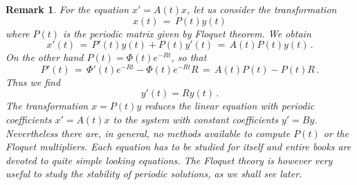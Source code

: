 \documentclass[12pt]{report}
\newtheorem{remark}[theorem]{Remark}
\begin{document}
\begin{remark}{\rm  For the equation $x'=A(t)x$, let us consider the 
transformation
\begin{equation}
x(t)\,=\, P(t) y(t)
\end{equation}
where $P(t)$ is the periodic matrix given by Floquet theorem.  We obtain
\begin{equation}
x'(t)\,=\, P'(t) y(t) + P(t) y'(t) \,=\, A(t) P(t) y(t) \,.
\end{equation}
On the other hand  $P(t) = \Phi(t) e^{-Rt}$, so that 
\begin{equation}
P'(t) \,=\, \Phi'(t) e^{-Rt} - \Phi(t)e^{-Rt} R \,=\, A(t) P(t) - P(t)R \,.
\end{equation}    
Thus we find 
\begin{equation}
y'(t)= R y(t) \,.
\end{equation}
The transformation $x=P(t)y$ reduces the linear equation with periodic
coefficients $x'=A(t)x$ to the system with constant coefficients
$y'=By$.  Nevertheless there are, in general, no methods available to
compute $P(t)$ or the Floquet multipliers. Each equation has to be
studied for itself and entire books are devoted to quite simple
looking equations. The Floquet theory is however very useful to study the
stability of periodic solutions, as we shall see later.}
\end{remark} 
\end{document}
